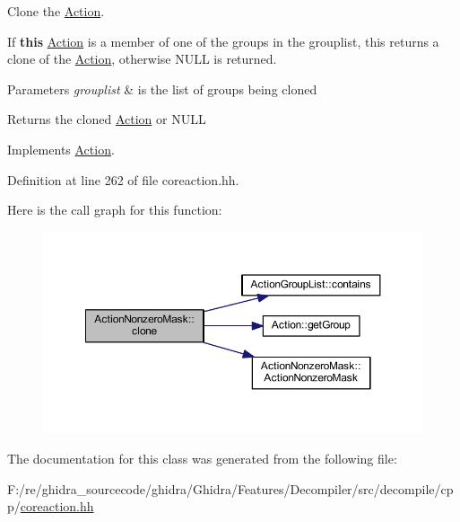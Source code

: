 Clone the \mbox{\hyperlink{class_action}{Action}}. 

If {\bfseries{this}} \mbox{\hyperlink{class_action}{Action}} is a member of one of the groups in the grouplist, this returns a clone of the \mbox{\hyperlink{class_action}{Action}}, otherwise N\+U\+LL is returned. 
\begin{DoxyParams}{Parameters}
{\em grouplist} & is the list of groups being cloned \\
\hline
\end{DoxyParams}
\begin{DoxyReturn}{Returns}
the cloned \mbox{\hyperlink{class_action}{Action}} or N\+U\+LL 
\end{DoxyReturn}


Implements \mbox{\hyperlink{class_action_af8242e41d09e5df52f97df9e65cc626f}{Action}}.



Definition at line 262 of file coreaction.\+hh.

Here is the call graph for this function\+:
\nopagebreak
\begin{figure}[H]
\begin{center}
\leavevmode
\includegraphics[width=350pt]{class_action_nonzero_mask_aee9f54ce67eaa18b65d667304dfd2124_cgraph}
\end{center}
\end{figure}


The documentation for this class was generated from the following file\+:\begin{DoxyCompactItemize}
\item 
F\+:/re/ghidra\+\_\+sourcecode/ghidra/\+Ghidra/\+Features/\+Decompiler/src/decompile/cpp/\mbox{\hyperlink{coreaction_8hh}{coreaction.\+hh}}\end{DoxyCompactItemize}
